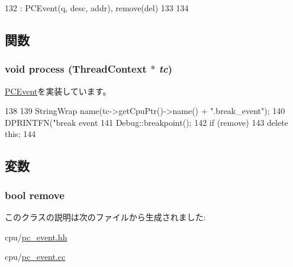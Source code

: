 \begin{DoxyCode}
132     : PCEvent(q, desc, addr), remove(del)
133 {
134 }
\end{DoxyCode}


\subsection{関数}
\hypertarget{classBreakPCEvent_ad66a9d5ec7cfe597b848a17c0df5cc28}{
\subsubsection[{process}]{\setlength{\rightskip}{0pt plus 5cm}void process ({\bf ThreadContext} $\ast$ {\em tc})}}
\label{classBreakPCEvent_ad66a9d5ec7cfe597b848a17c0df5cc28}


\hyperlink{classPCEvent_af6ff225900b7b98c08880da7225b38f0}{PCEvent}を実装しています。


\begin{DoxyCode}
138 {
139     StringWrap name(tc->getCpuPtr()->name() + ".break_event");
140     DPRINTFN("break event %
141     Debug::breakpoint();
142     if (remove)
143         delete this;
144 }
\end{DoxyCode}


\subsection{変数}
\hypertarget{classBreakPCEvent_a85e26bd0985e6b9f842e0f195beccb6c}{
\subsubsection[{remove}]{\setlength{\rightskip}{0pt plus 5cm}bool {\bf remove}}}
\label{classBreakPCEvent_a85e26bd0985e6b9f842e0f195beccb6c}


このクラスの説明は次のファイルから生成されました:\begin{DoxyCompactItemize}
\item 
cpu/\hyperlink{pc__event_8hh}{pc\_\-event.hh}\item 
cpu/\hyperlink{pc__event_8cc}{pc\_\-event.cc}\end{DoxyCompactItemize}
